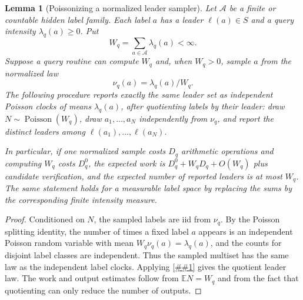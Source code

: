 \documentclass[10pt]{article}
\newcommand{\cref}[1]{\ref{##1}}
\newtheorem{lemma}[theorem]{Lemma}
\theoremstyle{definition}
\newcommand{\E}{\mathbb{E}}
\begin{document}
\begin{lemma}[Poissonizing a normalized leader sampler]
   \label{lem:poissonized-normalized-leader-sampler}
   Let \(\mathcal A\) be a finite or countable hidden label family.  Each
   label \(a\) has a leader \(\ell(a)\in S\) and a query intensity
   \(\lambda_q(a)\ge0\).  Put
   \[
      W_q=\sum_{a\in\mathcal A}\lambda_q(a)<\infty .
   \]
   Suppose a query routine can compute \(W_q\) and, when \(W_q>0\), sample
   \(a\) from the normalized law
   \[
      \nu_q(a)=\lambda_q(a)/W_q .
   \]
   The following procedure reports exactly the same leader set as independent
   Poisson clocks of means \(\lambda_q(a)\), after quotienting labels by their
   leader:
   draw \(N\sim\operatorname{Poisson}(W_q)\), draw
   \(a_1,\ldots,a_N\) independently from \(\nu_q\), and report the distinct
   leaders among \(\ell(a_1),\ldots,\ell(a_N)\).

   In particular, if one normalized sample costs \(D_q\) arithmetic operations
   and computing \(W_q\) costs \(D_q^0\), the expected work is
   \(D_q^0+W_qD_q+O(W_q)\) plus candidate verification, and the expected number
   of reported leaders is at most \(W_q\).  The same statement holds for a
   measurable label space by replacing the sums by the corresponding finite
   intensity measure.
\end{lemma}

\begin{proof}
   Conditioned on \(N\), the sampled labels are iid from \(\nu_q\).  By the
   Poisson splitting identity, the number of times a fixed label \(a\) appears
   is an independent Poisson random variable with mean
   \(W_q\nu_q(a)=\lambda_q(a)\), and the counts for disjoint label classes are
   independent.  Thus the sampled multiset has the same law as the independent
   label clocks.  Applying \cref{lem:poisson-leader-superposition} gives the
   quotient leader law.  The work and output estimates follow from
   \(\E N=W_q\) and from the fact that quotienting can only reduce the number
   of outputs.
\end{proof}
\end{document}
